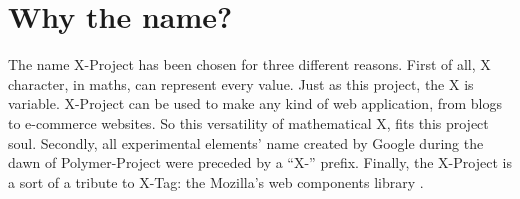 \section{Why the name?}
\label{sec:XPR_name}

The name X-Project has been chosen for three different reasons.
First of all, X character, in maths, can represent every value. Just as this project, the X is variable. X-Project can be used to make any kind of web application, from blogs to e-commerce websites.
So this versatility of mathematical X, fits this project soul.
Secondly, all experimental elements' name created by Google during the dawn of Polymer-Project were preceded by a ``X-'' prefix.
Finally, the X-Project is a sort of a tribute to X-Tag: the Mozilla's web components library \cite{xtag}.
